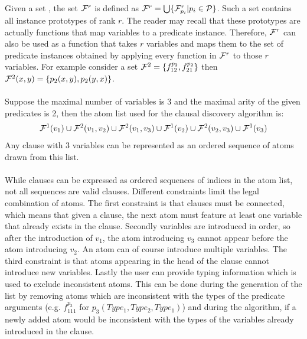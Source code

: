 Given a set , the set $\mathcal{F}^r$ is defined as $\mathcal{F}^r = \bigcup \{\mathcal{F}^r_{p_i} | p_i \in \mathcal{P}\}$.
Such a set contains all instance prototypes of rank $r$.
The reader may recall that these prototypes are actually functions that map variables to a predicate instance.
Therefore, $\mathcal{F}^r$ can also be used as a function that takes $r$ variables and maps them to the set of predicate instances obtained by applying every function in $\mathcal{F}^r$ to those $r$ variables.
For example consider a set $\mathcal{F}^2 = \{f^{p_2}_{12}, f^{p_2}_{21}\}$ then $\mathcal{F}^2(x, y) = \{p_2(x, y), p_2(y, x)\}$.
\\\\
Suppose the maximal number of variables is 3 and the maximal arity of the given predicates is 2, then the atom list used for the clausal discovery algorithm is:
\begin{align*}
\mathcal{F}^1(v_1) \cup \mathcal{F}^2(v_1, v_2) \cup \mathcal{F}^2(v_1, v_3) \cup \mathcal{F}^1(v_2) \cup \mathcal{F}^2(v_2, v_3) \cup \mathcal{F}^1(v_3)
\end{align*}
Any clause with 3 variables can be represented as an ordered sequence of atoms drawn from this list.
\\\\
While clauses can be expressed as ordered sequences of indices in the atom list, not all sequences are valid clauses.
Different constraints limit the legal combination of atoms.
The first constraint is that clauses must be connected, which means that given a clause, the next atom must feature at least one variable that already exists in the clause.
Secondly variables are introduced in order, so after the introduction of $v_1$, the atom introducing $v_3$ cannot appear before the atom introducing $v_2$.
An atom can of course introduce multiple variables.
The third constraint is that atoms appearing in the head of the clause cannot introduce new variables.
Lastly the user can provide typing information which is used to exclude inconsistent atoms.
This can be done during the generation of the list by removing atoms which are inconsistent with the types of the predicate arguments (e.g. $f^{p_3}_{111}$ for $p_3(Type_1, Type_2, Type_1)$) and during the algorithm, if a newly added atom would be inconsistent with the types of the variables already introduced in the clause.

